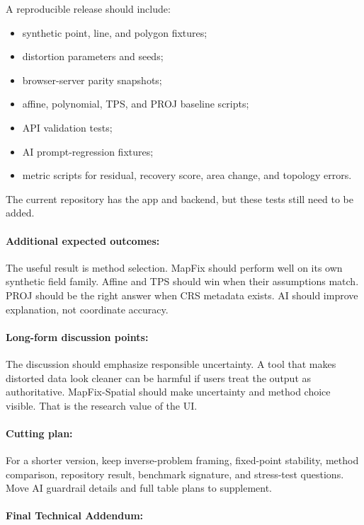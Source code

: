\documentclass{article}
\begin{document}
A reproducible release should include:
\begin{itemize}
  \item synthetic point, line, and polygon fixtures;
  \item distortion parameters and seeds;
  \item browser-server parity snapshots;
  \item affine, polynomial, TPS, and PROJ baseline scripts;
  \item API validation tests;
  \item AI prompt-regression fixtures;
  \item metric scripts for residual, recovery score, area change, and topology errors.
\end{itemize}
The current repository has the app and backend, but these tests still need to be added.

\paragraph{Additional expected outcomes:}

The useful result is method selection. MapFix should perform well on its own synthetic field family. Affine and TPS should win when their assumptions match. PROJ should be the right answer when CRS metadata exists. AI should improve explanation, not coordinate accuracy.

\paragraph{Long-form discussion points:}

The discussion should emphasize responsible uncertainty. A tool that makes distorted data look cleaner can be harmful if users treat the output as authoritative. MapFix-Spatial should make uncertainty and method choice visible. That is the research value of the UI.

\paragraph{Cutting plan:}

For a shorter version, keep inverse-problem framing, fixed-point stability, method comparison, repository result, benchmark signature, and stress-test questions. Move AI guardrail details and full table plans to supplement.

\paragraph{Final Technical Addendum:}
\end{document}
